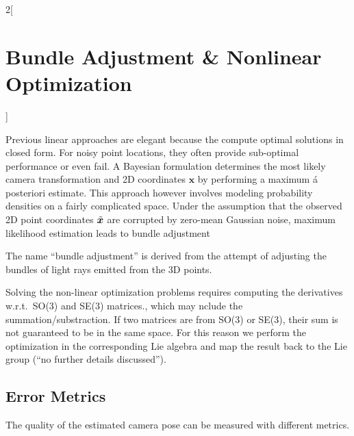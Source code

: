 \documentclass[oneside,fontsize=11pt,paper=a4]{scrartcl}
\begin{document}



\begin{multicols}{2}[\section{Bundle Adjustment \& Nonlinear Optimization}]

Previous linear approaches are elegant because the compute optimal solutions in closed form. For noisy point locations, they often provide sub-optimal performance or even fail. A Bayesian formulation determines the most likely camera transformation and 2D coordinates $\boldsymbol{x}$ by performing a maximum á posteriori estimate. This approach however involves modeling probability densities on a fairly complicated space. Under the assumption that the observed 2D point coordinates $\Tilde{\boldsymbol{x}}$ are corrupted by zero-mean Gaussian noise, maximum likelihood estimation leads to bundle adjustment

The name ``bundle adjustment'' is derived from the attempt of adjusting the bundles of light rays emitted from the 3D points.

Solving the non-linear optimization problems requires computing the derivatives w.r.t.\ SO(3) and SE(3) matrices., which may nclude the summation/substraction. If two matrices are from SO(3) or SE(3), their sum is not guaranteed to be in the same space. For this reason we perform the optimization in the corresponding Lie algebra and map the result back to the Lie group (``no further details discussed'').


\subsection{Error Metrics}

The quality of the estimated camera pose can be measured with different metrics.


\end{multicols}
\end{document}
